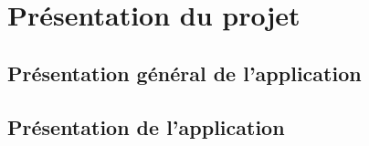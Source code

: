\chapter{Présentation du projet}

	\section{Présentation général de l'application}

	\section{Présentation de l'application}

